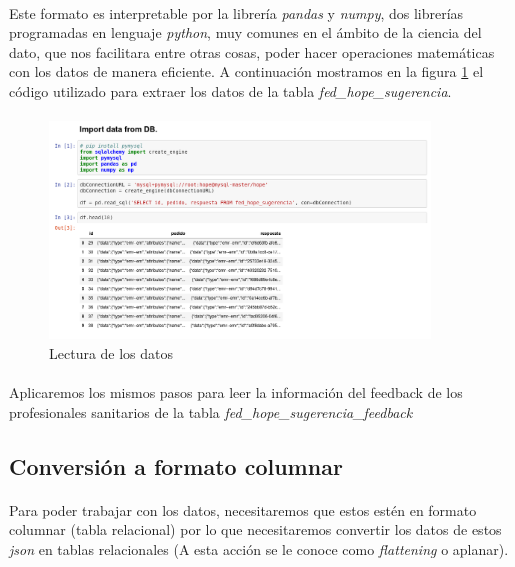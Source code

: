 \documentclass[10pt,a4paper,oneside]{book}
\begin{document}
\paragraph{}
Este formato es interpretable por la librería \textit{pandas} y \textit{numpy}, dos librerías programadas en lenguaje \textit{python}, muy comunes en el ámbito de la ciencia del dato, que nos facilitara entre otras cosas, poder hacer operaciones matemáticas con los datos de manera eficiente. A continuación mostramos en la figura \ref{readDataBD} el código utilizado para extraer los datos de la tabla \textit{fed\_hope\_sugerencia}.

\paragraph{}
\begin{figure}[!htb]
  \centering
    \includegraphics[width=0.9\textwidth]{images/metodologia-extract-data-mysql.png}
    \caption{Lectura de los datos}
  \label{readDataBD}
\end{figure}

\paragraph{}
Aplicaremos los mismos pasos para leer la información del feedback de los profesionales sanitarios de la tabla \textit{fed\_hope\_sugerencia\_feedback}

\newpage
\subsection{Conversión a formato columnar}

\paragraph{}
Para poder trabajar con los datos, necesitaremos que estos estén en formato columnar (tabla relacional) por lo que necesitaremos convertir los datos de estos \textit{json} en tablas relacionales (A esta acción se le conoce como \textit{flattening} o aplanar). 
\end{document}
